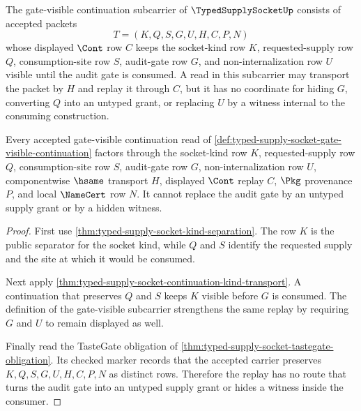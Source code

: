 \begin{definition}
\label{def:typed-supply-socket-gate-visible-continuation}
The gate-visible continuation subcarrier of $\TypedSupplySocketUp$ consists of accepted packets
$$
T=(K,Q,S,G,U,H,C,P,N)
$$
whose displayed $\Cont$ row $C$ keeps the socket-kind row $K$, requested-supply row $Q$, consumption-site row $S$, audit-gate row $G$, and non-internalization row $U$ visible until the audit gate is consumed. A read in this subcarrier may transport the packet by $H$ and replay it through $C$, but it has no coordinate for hiding $G$, converting $Q$ into an untyped grant, or replacing $U$ by a witness internal to the consuming construction.
\end{definition}

\begin{theorem}
\label{thm:typed-supply-socket-audit-gate-nonescape}
Every accepted gate-visible continuation read of \autoref{def:typed-supply-socket-gate-visible-continuation} factors through the socket-kind row $K$, requested-supply row $Q$, consumption-site row $S$, audit-gate row $G$, non-internalization row $U$, componentwise $\hsame$ transport $H$, displayed $\Cont$ replay $C$, $\Pkg$ provenance $P$, and local $\NameCert$ row $N$. It cannot replace the audit gate by an untyped supply grant or by a hidden witness.
\end{theorem}
\begin{proof}
First use \autoref{thm:typed-supply-socket-kind-separation}. The row $K$ is the public separator for the socket kind, while $Q$ and $S$ identify the requested supply and the site at which it would be consumed.

Next apply \autoref{thm:typed-supply-socket-continuation-kind-transport}. A continuation that preserves $Q$ and $S$ keeps $K$ visible before $G$ is consumed. The definition of the gate-visible subcarrier strengthens the same replay by requiring $G$ and $U$ to remain displayed as well.

Finally read the TasteGate obligation of \autoref{thm:typed-supply-socket-tastegate-obligation}. Its checked marker records that the accepted carrier preserves $K,Q,S,G,U,H,C,P,N$ as distinct rows. Therefore the replay has no route that turns the audit gate into an untyped supply grant or hides a witness inside the consumer.
\end{proof}

